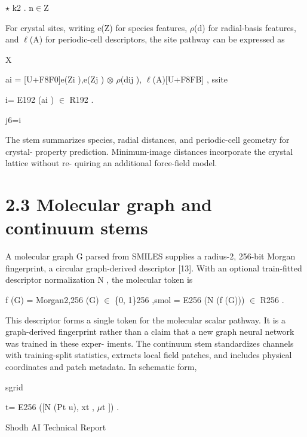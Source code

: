 \documentclass[11pt]{article}
\begin{document}
\ensuremath{\star}
k2 .
n\ensuremath{\in}Z

For crystal sites, writing e(Z) for species features, \ensuremath{\rho}(d) for radial-basis features, and \ensuremath{\ell}(A)
for periodic-cell descriptors, the site pathway can be expressed as

\noindent [U+F8EE]\quad [U+F8F9]\par

X

\noindent ai = [U+F8F0]e(Zi ),\quad e(Zj ) \ensuremath{\otimes} \ensuremath{\rho}(dij ), \ensuremath{\ell}(A)[U+F8FB] ,  ssite\par


\noindent i\quad = E192 (ai ) \ensuremath{\in} R192 .\par

j6=i

The stem summarizes species, radial distances, and periodic-cell geometry for crystal-
property prediction. Minimum-image distances incorporate the crystal lattice without re-
quiring an additional force-field model.

\section*{2.3 Molecular graph and continuum stems}

A molecular graph G parsed from SMILES supplies a radius-2, 256-bit Morgan fingerprint, a
circular graph-derived descriptor [13]. With an optional train-fitted descriptor normalization
N , the molecular token is

\noindent f (G) = Morgan2,256 (G) \ensuremath{\in} \{0, 1\}256 ,\quad smol = E256 (N (f (G))) \ensuremath{\in} R256 .\par

This descriptor forms a single token for the molecular scalar pathway. It is a graph-derived
fingerprint rather than a claim that a new graph neural network was trained in these exper-
iments.
The continuum stem standardizes channels with training-split statistics, extracts local field
patches, and includes physical coordinates and patch metadata. In schematic form,

sgrid

\noindent t\quad = E256 ([N (Pt u), xt , \ensuremath{\mu}t ]) .\par




\noindent Shodh AI Technical Report\par
\end{document}
